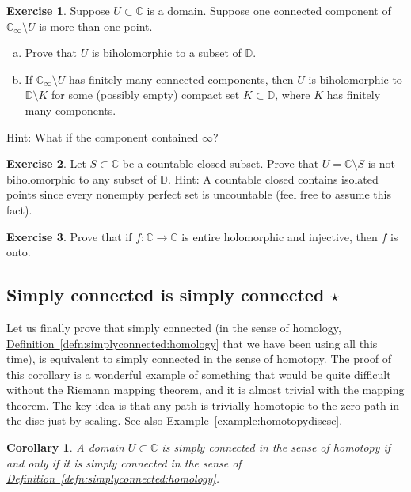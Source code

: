 \documentclass[12pt,openany]{book}
\newcommand{\C}{{\mathbb{C}}}
\newcommand{\D}{{\mathbb{D}}}
\theoremstyle{plain}
\newtheorem{cor}[thm]{Corollary}
\theoremstyle{remark}
\theoremstyle{definition}
\newenvironment{exbox}{%
    \def\FrameCommand{\vrule width 1pt \relax\hspace{10pt}}%
    \MakeFramed{\advance\hsize-\width\FrameRestore}%
}{%
    \endMakeFramed
}
\newenvironment{exparts}{%
    \leavevmode\begin{enumerate}[a),noitemsep,topsep=0pt,parsep=0pt,partopsep=0pt]
}{%
    \end{enumerate}
}
\theoremstyle{exercise}
\newtheorem{exercise}{Exercise}[section]
\theoremstyle{example}
\newcommand{\exampleref}[1]{\hyperref[#1]{Example~\ref*{#1}}}
\newcommand{\defnref}[1]{\hyperref[#1]{Definition~\ref*{#1}}}
\begin{document}
\begin{exbox}
\begin{exercise}
Suppose $U \subset \C$ is a domain.  Suppose one connected component of $\C_\infty
\setminus U$ is more than one point.
\begin{exparts}
\item
Prove that $U$ is biholomorphic to a subset of $\D$.
\item
If $\C_\infty \setminus U$ has finitely many connected components, then
$U$ is biholomorphic to $\D \setminus K$ for some (possibly empty) compact set
$K \subset \D$, where $K$ has finitely many components.
\end{exparts}
Hint: What if the component contained $\infty$?
\end{exercise}

\begin{exercise}
Let $S \subset \C$ be a countable closed subset.
Prove that $U = \C \setminus S$ is not biholomorphic
to any subset of $\D$.  Hint: A countable closed contains isolated points
since every nonempty perfect set is uncountable
(feel free to assume this fact).
\end{exercise}

\begin{exercise}
Prove that 
if $f \colon \C \to \C$ is entire holomorphic and injective, then $f$ is
onto.
\end{exercise}
\end{exbox}

\subsection{Simply connected is simply connected \texorpdfstring{$\star$}{*}}

Let us finally prove that simply connected (in the sense of homology,
\defnref{defn:simplyconnected:homology} that we have been using all this
time), is equivalent to simply connected in the sense of homotopy.
The proof of this corollary is a wonderful example of something that would
be quite difficult without the
\hyperref[thm:RMT]{Riemann mapping theorem}, and it is almost
trivial with the mapping theorem.
The key idea is that any path is trivially homotopic to the zero path in the
disc just by scaling.  See also \exampleref{example:homotopydiscsc}.

\begin{cor} \label{cor:simplyconnhard}
A domain $U \subset \C$ is simply connected in the sense of homotopy
if and only if
it is simply connected in the sense of \defnref{defn:simplyconnected:homology}.
\end{cor}
\end{document}
